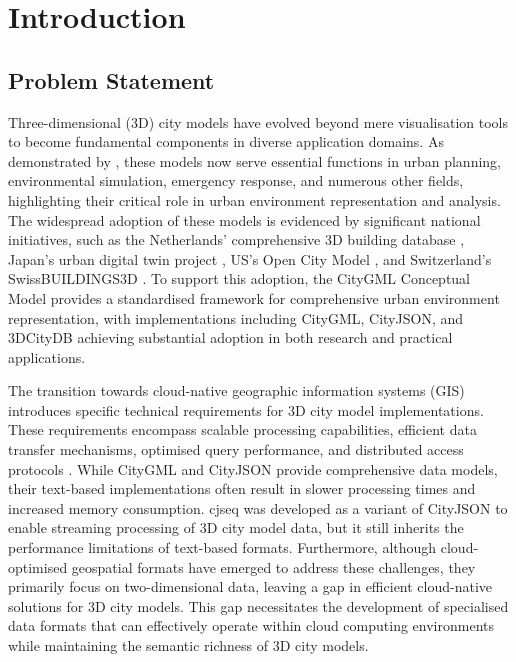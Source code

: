 
\chapter{Introduction}%
\label{introduction}

\section{Problem Statement}
\label{introduction:problem_statement}
Three-dimensional (3D) city models have evolved beyond mere visualisation tools to become fundamental components in diverse application domains.
As demonstrated by \citet{biljecki_2015}, these models now serve essential functions in urban planning, environmental simulation, emergency response, and numerous other fields, highlighting their critical role in urban environment representation and analysis.
The widespread adoption of these models is evidenced by significant national initiatives, such as the Netherlands' comprehensive 3D building database \citep{3dbag}, Japan's urban digital twin project \citep{plateau}, US's Open City Model \citep{us_buildings3d}, and Switzerland's SwissBUILDINGS3D \citep{swiss_buildings3d}.
To support this adoption, the CityGML Conceptual Model \citep{CityGML} provides a standardised framework for comprehensive urban environment representation, with implementations including CityGML, CityJSON, and 3DCityDB achieving substantial adoption in both research and practical applications.

The transition towards cloud-native geographic information systems (GIS) introduces specific technical requirements for 3D city model implementations.
These requirements encompass scalable processing capabilities, efficient data transfer mechanisms, optimised query performance, and distributed access protocols \citep{cloud-optimised-formats}.
While CityGML and CityJSON provide comprehensive data models, their text-based implementations often result in slower processing times and increased memory consumption. \ac{cjseq} was developed as a variant of CityJSON to enable streaming processing of 3D city model data, but it still inherits the performance limitations of text-based formats.
Furthermore, although cloud-optimised geospatial formats have emerged to address these challenges, they primarily focus on two-dimensional data, leaving a gap in efficient cloud-native solutions for 3D city models.
This gap necessitates the development of specialised data formats that can effectively operate within cloud computing environments while maintaining the semantic richness of 3D city models.

